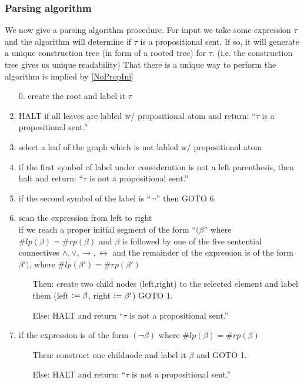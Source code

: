 \subsubsection*{Parsing algorithm}
We now give a parsing algorithm procedure. For input we take some expression $\tau$ and the algorithm will determine if $\tau$ is a propositional sent.
If so, it will generate a unique construction tree (in form of a rooted tree) for $\tau$. (i.e. the construction tree gives us unique readability)
That there is a unique way to perform the algorithm is implied by \ref{NoPropIni}
\begin{enumerate}
    \item[0.] create the root and label it $\tau$
    \item HALT if all leaves are labled w/ propositional atom and return: ``$\tau$ is a propositional sent.''
    \item select a leaf of the graph which is not labled w/ propositional atom
    \item if the first symbol of label under consideration is not a left parenthesis, then halt and return: ``$\tau$ is not a propositional sent.''
    \item if the second symbol of the label is ``$\lnot$'' then GOTO 6.
    \item scan the expression from left to right\\
    if we reach a proper initial segment of the form ``$(\beta$'' where $\# lp(\beta) = \#rp(\beta)$ and $\beta$ is followed by one of the five sentential connectives
    $\land,\lor,\to,\leftrightarrow$ and the remainder of the expression is of the form $\beta')$, where $\# lp(\beta') = \#rp(\beta')$
    \begin{itemize}
        \item [Then:] create two child nodes (left,right) to the selected element and label them (left $\vcentcolon= \beta$, right $\vcentcolon= \beta'$) GOTO 1.
        \item [Else:] HALT and return ``$\tau$ is not a propositional sent.''
    \end{itemize}
    
    \item if the expression is of the form $(\lnot \beta)$ where $\# lp(\beta) = \#rp(\beta)$
    \begin{itemize}
        \item [Then:] construct one childnode and label it $\beta$ and GOTO 1.
        \item [Else:] HALT and return: ``$\tau$ is not a propositional sent.''
    \end{itemize}
\end{enumerate}
